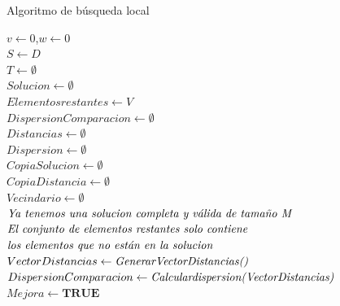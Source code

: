 \documentclass{article}
\begin{document}
\begin{algorithm}[H]
  \scriptsize
  \label{Algoritmo Busqueda Local}
  \caption{Algoritmo de búsqueda local}
  $v \leftarrow 0 $,$ w\leftarrow 0 $\\
  $ S\leftarrow D $\\
  $T \leftarrow \emptyset $\\
$Solucion \leftarrow \emptyset$\\
$Elementos restantes \leftarrow V$\\
$Dispersion Comparacion \leftarrow \emptyset$\\
$Distancias \leftarrow \emptyset$\\
$Dispersion \leftarrow \emptyset$\\
\vspace{3mm}
$Copia Solucion \leftarrow \emptyset$\\
$Copia Distancia \leftarrow \emptyset$\\
$Vecindario \leftarrow \emptyset$\\
\vspace{3mm}
$\emph{Ya tenemos una solucion completa y válida de tamaño M}$\\
$\emph{El conjunto de elementos restantes solo contiene}$\\
$\emph{los elementos que no están en la solucion}$\\
\vspace{3mm}
$Vector Distancias \leftarrow{\emph{GenerarVectorDistancias()}}$\\
$Dispersion Comparacion \leftarrow{\emph{Calculardispersion(VectorDistancias)}}$\\
\vspace{3mm}
$Mejora \leftarrow {\textbf{TRUE}}$\\


\end{algorithm}
\end{document}
